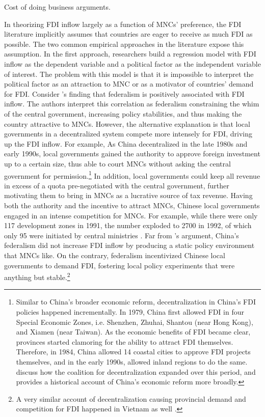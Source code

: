 Cost of doing business arguments. 

In theorizing FDI inflow largely as a function of MNCs' preference, the FDI
literature implicitly assumes that countries are eager to receive as much FDI as
possible. The two common empirical approaches in the literature expose this
assumption. In the first approach, researchers build a regression model with FDI
inflow as the dependent variable and a political factor as the independent
variable of interest. The problem with this model is that it is impossible to
interpret the political factor as an attraction to MNC or as a motivator of
countries' demand for FDI. Consider \citet{Jensen2005}'s finding that federalism
is positively associated with FDI inflow. The authors interpret this correlation
as federalism constraining the whim of the central government, increasing policy
stabilities, and thus making the country attractive to MNCs. However, the
alternative explanation is that local governments in a decentralized system
compete more intensely for FDI, driving up the FDI inflow. For example, As China
decentralized in the late 1980s and early 1990s, local governments gained the
authority to approve foreign investment up to a certain size, thus able to court
MNCs without asking the central government for permission.\footnote{Similar to
  China's broader economic reform, decentralization in China's FDI policies
  happened incrementally. In 1979, China first allowed FDI in four Special
  Economic Zones, i.e. Shenzhen, Zhuhai, Shantou (near Hong Kong), and Xiamen
  (near Taiwan). As the economic benefits of FDI became clear, provinces started
  clamoring for the ability to attract FDI themselves. Therefore, in 1984, China
  allowed 14 coastal cities to approve FDI projects themselves, and in the early
  1990s, allowed inland regions to do the same. \citet{Gallagher2002, Shirk1993}
  discuss how the coalition for decentralization expanded over this period, and
  \citet{Coase2012} provides a historical account of China's economic reform
  more broadly.} In addition, local governments could keep all revenue in excess
of a quota pre-negotiated with the central government, further motivating them
to bring in MNCs as a lucrative source of tax revenue. Having both the authority
and the incentive to attract MNCs, Chinese local governments engaged in an
intense competition for MNCs. For example, while there were only 117 development
zones in 1991, the number exploded to 2700 in 1992, of which only 95 were
initiated by central ministries \citep{Montinola1995}. Far from
\citet{Jensen2005}'s argument, China's federalism did not increase FDI inflow by
producing a static policy environment that MNCs like. On the contrary,
federalism incentivized Chinese local governments to demand FDI, fostering
local policy experiments that were anything but stable.\footnote{A very similar
  account of decentralization causing provincial demand and competition for FDI happened in Vietnam
  as well \citep{Malesky2004c}.}

